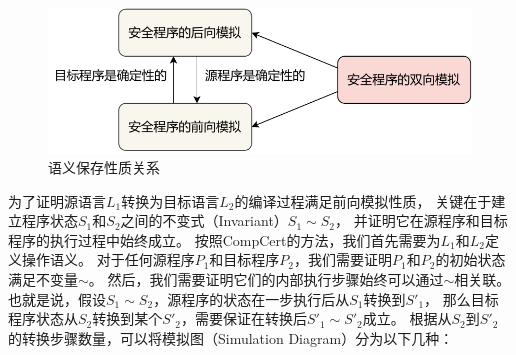 \begin{figure}[htbp]
    \centering
    \includegraphics[width=0.7\linewidth]{figures/relation.pdf}
    \caption{语义保存性质关系}\label{fig:relation}
\end{figure}

为了证明源语言$L_1$转换为目标语言$L_2$的编译过程满足前向模拟性质，
关键在于建立程序状态$S_1$和$S_2$之间的不变式（Invariant）$S_1\sim S_2$，
并证明它在源程序和目标程序的执行过程中始终成立。
按照CompCert的方法，我们首先需要为$L_1$和$L_2$定义操作语义。
对于任何源程序$P_1$和目标程序$P_2$，我们需要证明$P_1$和$P_2$的初始状态满足不变量$\sim$。
然后，我们需要证明它们的内部执行步骤始终可以通过$\sim$相关联。
也就是说，假设$S_1\sim S_2$，源程序的状态在一步执行后从$S_1$转换到$S'_1$，
那么目标程序状态从$S_2$转换到某个$S'_2$，需要保证在转换后$S'_1\sim S'_2$成立。
根据从$S_2$到$S'_2$的转换步骤数量，可以将模拟图（Simulation Diagram）分为以下几种：

